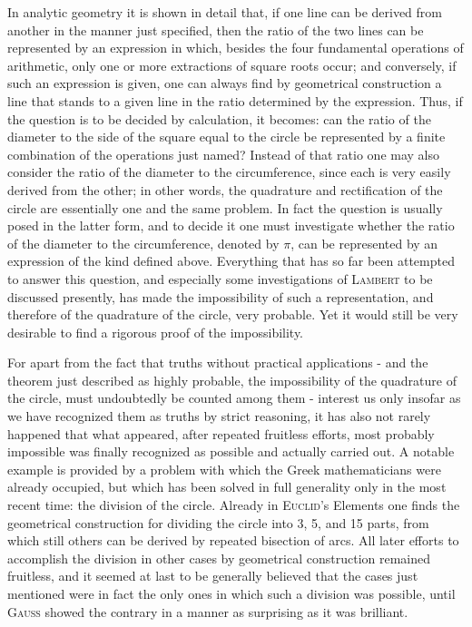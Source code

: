 \documentclass[11pt]{article}
\newcommand{\scn}[1]{\textsc{#1}}
\begin{document}
In analytic geometry it is shown in detail that, if one line can be derived from another in the manner just specified, then the ratio of the two lines can be represented by an expression in which, besides the four fundamental operations of arithmetic, only one or more extractions of square roots occur; and conversely, if such an expression is given, one can always find by geometrical construction a line that stands to a given line in the ratio determined by the expression. Thus, if the question is to be decided by calculation, it becomes: can the ratio of the diameter to the side of the square equal to the circle be represented by a finite combination of the operations just named? Instead of that ratio one may also consider the ratio of the diameter to the circumference, since each is very easily derived from the other; in other words, the quadrature and rectification of the circle are essentially one and the same problem. In fact the question is usually posed in the latter form, and to decide it one must investigate whether the ratio of the diameter to the circumference, denoted by $\pi$, can be represented by an expression of the kind defined above. Everything that has so far been attempted to answer this question, and especially some investigations of \scn{Lambert} to be discussed presently, has made the impossibility of such a representation, and therefore of the quadrature of the circle, very probable. Yet it would still be very desirable to find a rigorous proof of the impossibility.

For apart from the fact that truths without practical applications - and the theorem just described as highly probable, the impossibility of the quadrature of the circle, must undoubtedly be counted among them - interest us only insofar as we have recognized them as truths by strict reasoning, it has also not rarely happened that what appeared, after repeated fruitless efforts, most probably impossible was finally recognized as possible and actually carried out. A notable example is provided by a problem with which the Greek mathematicians were already occupied, but which has been solved in full generality only in the most recent time: the division of the circle. Already in \scn{Euclid}'s Elements one finds the geometrical construction for dividing the circle into 3, 5, and 15 parts, from which still others can be derived by repeated bisection of arcs. All later efforts to accomplish the division in other cases by geometrical construction remained fruitless, and it seemed at last to be generally believed that the cases just mentioned were in fact the only ones in which such a division was possible, until \scn{Gauss} showed the contrary in a manner as surprising as it was brilliant.
\end{document}
